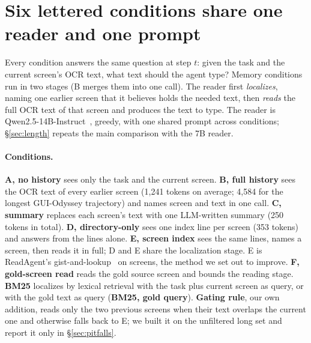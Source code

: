 \section{Six lettered conditions share one reader and one prompt}
\label{sec:setup}
Every condition answers the same question at step $t$: given the task and the current screen's OCR text, what text should the agent type? Memory conditions run in two stages (B merges them into one call). The reader first \emph{localizes}, naming one earlier screen that it believes holds the needed text, then \emph{reads} the full OCR text of that screen and produces the text to type. The reader is Qwen2.5-14B-Instruct~\citep{qwen25}, greedy, with one shared prompt across conditions; \S\ref{sec:length} repeats the main comparison with the 7B reader.

\paragraph{Conditions.}
\textbf{A, no history} sees only the task and the current screen. \textbf{B, full history} sees the OCR text of every earlier screen (1,241 tokens on average; 4,584 for the longest GUI-Odyssey trajectory) and names screen and text in one call. \textbf{C, summary} replaces each screen's text with one LLM-written summary (250 tokens in total). \textbf{D, directory-only} sees one index line per screen (353 tokens) and answers from the lines alone. \textbf{E, screen index} sees the same lines, names a screen, then reads it in full; D and E share the localization stage. E is ReadAgent's gist-and-lookup~\citep{readagent} on screens, the method we set out to improve. \textbf{F, gold-screen read} reads the gold source screen and bounds the reading stage. \textbf{BM25} localizes by lexical retrieval with the task plus current screen as query, or with the gold text as query (\textbf{BM25, gold query}). \textbf{Gating rule}, our own addition, reads only the two previous screens when their text overlaps the current one and otherwise falls back to E; we built it on the unfiltered long set and report it only in \S\ref{sec:pitfalls}.

